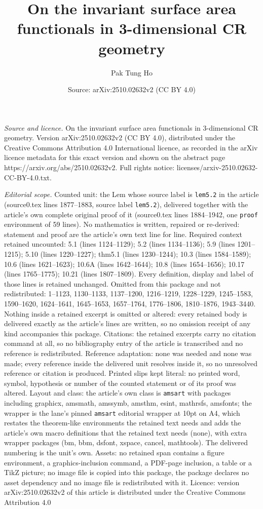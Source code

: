 \documentclass[10pt,a4paper]{amsart}
\title[On the invariant surface area functionals in 3-dimensional C]{On the invariant surface area functionals in 3-dimensional CR geometry}
\author{Pak Tung Ho}
\date{Source: arXiv:2510.02632v2 (CC BY 4.0)}
\begin{document}
\maketitle

\noindent\emph{Source and licence.} On the invariant surface area functionals in 3-dimensional CR geometry. Version arXiv:2510.02632v2 (CC BY 4.0), distributed under the Creative Commons Attribution 4.0 International licence, as recorded in the arXiv licence metadata for this exact version and shown on the abstract page https://arxiv.org/abs/2510.02632v2. Full rights notice: licenses/arxiv-2510.02632-CC-BY-4.0.txt.\par\smallskip

\noindent\textit{Editorial scope.} Counted unit: the Lem whose source label is \texttt{lem5.2} in the article (source0.tex lines 1877--1883, source label \texttt{lem5.2}), delivered together with the article's own complete original proof of it (source0.tex lines 1884--1942, one \texttt{proof} environment of 59 lines). No mathematics is written, repaired or re-derived: statement and proof are the article's own text line for line. Required context retained uncounted: 5.1 (lines 1124--1129); 5.2 (lines 1134--1136); 5.9 (lines 1201--1215); 5.10 (lines 1220--1227); thm5.1 (lines 1230--1244); 10.3 (lines 1584--1589); 10.6 (lines 1621--1623); 10.6A (lines 1642--1644); 10.8 (lines 1654--1656); 10.17 (lines 1765--1775); 10.21 (lines 1807--1809). Every definition, display and label of those lines is retained unchanged. Omitted from this package and not redistributed: 1--1123, 1130--1133, 1137--1200, 1216--1219, 1228--1229, 1245--1583, 1590--1620, 1624--1641, 1645--1653, 1657--1764, 1776--1806, 1810--1876, 1943--3440. Nothing inside a retained excerpt is omitted or altered: every retained body is delivered exactly as the article's lines are written, so no omission receipt of any kind accompanies this package. Citations: the retained excerpts carry no citation command at all, so no bibliography entry of the article is transcribed and no reference is redistributed. Reference adaptation: none was needed and none was made; every reference inside the delivered unit resolves inside it, so no unresolved reference or citation is produced. Printed slips kept literal: no printed word, symbol, hypothesis or number of the counted statement or of its proof was altered. Layout and class: the article's own class is \texttt{amsart} with packages including graphicx, amsmath, amssymb, amsthm, esint, mathrsfs, amsfonts; the wrapper is the lane's pinned \texttt{amsart} editorial wrapper at 10pt on A4, which restates the theorem-like environments the retained text needs and adds the article's own macro definitions that the retained text needs (none), with extra wrapper packages (bm, bbm, dsfont, xspace, cancel, mathtools). The delivered numbering is the unit's own. Assets: no retained span contains a figure environment, a graphics-inclusion command, a PDF-page inclusion, a table or a TikZ picture; no image file is copied into this package, the package declares no asset dependency and no image file is redistributed with it. Licence: version arXiv:2510.02632v2 of this article is distributed under the Creative Commons Attribution 4.0 
\end{document}
